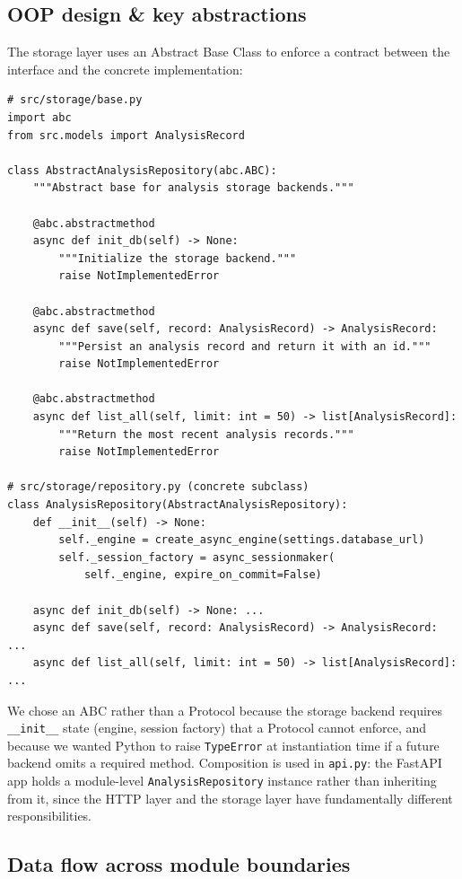 \documentclass[11pt,a4paper]{article}
\begin{document}
\subsection{OOP design \& key abstractions}

The storage layer uses an Abstract Base Class to enforce a contract between the interface and the concrete implementation:

\begin{lstlisting}[style=python]
# src/storage/base.py
import abc
from src.models import AnalysisRecord

class AbstractAnalysisRepository(abc.ABC):
    """Abstract base for analysis storage backends."""

    @abc.abstractmethod
    async def init_db(self) -> None:
        """Initialize the storage backend."""
        raise NotImplementedError

    @abc.abstractmethod
    async def save(self, record: AnalysisRecord) -> AnalysisRecord:
        """Persist an analysis record and return it with an id."""
        raise NotImplementedError

    @abc.abstractmethod
    async def list_all(self, limit: int = 50) -> list[AnalysisRecord]:
        """Return the most recent analysis records."""
        raise NotImplementedError

# src/storage/repository.py (concrete subclass)
class AnalysisRepository(AbstractAnalysisRepository):
    def __init__(self) -> None:
        self._engine = create_async_engine(settings.database_url)
        self._session_factory = async_sessionmaker(
            self._engine, expire_on_commit=False)

    async def init_db(self) -> None: ...
    async def save(self, record: AnalysisRecord) -> AnalysisRecord: ...
    async def list_all(self, limit: int = 50) -> list[AnalysisRecord]: ...
\end{lstlisting}

We chose an ABC rather than a Protocol because the storage backend requires \texttt{\_\_init\_\_} state (engine, session factory) that a Protocol cannot enforce, and because we wanted Python to raise \texttt{TypeError} at instantiation time if a future backend omits a required method. Composition is used in \texttt{api.py}: the FastAPI app holds a module-level \texttt{AnalysisRepository} instance rather than inheriting from it, since the HTTP layer and the storage layer have fundamentally different responsibilities.

\subsection{Data flow across module boundaries}
\end{document}
